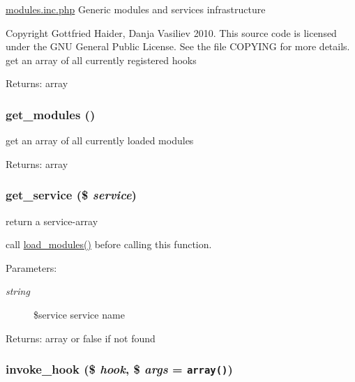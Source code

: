 \hyperlink{modules_8inc_8php}{modules.inc.php} Generic modules and services infrastructure

Copyright Gottfried Haider, Danja Vasiliev 2010. This source code is licensed under the GNU General Public License. See the file COPYING for more details. get an array of all currently registered hooks

\begin{Desc}
\item[Returns:]array \end{Desc}
\hypertarget{modules_8inc_8php_1b73e435e11b07906d0781b146b4aa21}{
\subsubsection[{get\_\-modules}]{\setlength{\rightskip}{0pt plus 5cm}get\_\-modules ()}}
\label{modules_8inc_8php_1b73e435e11b07906d0781b146b4aa21}


get an array of all currently loaded modules

\begin{Desc}
\item[Returns:]array \end{Desc}
\hypertarget{modules_8inc_8php_bf7633223c2fd4ecb199a8e0dc070802}{
\subsubsection[{get\_\-service}]{\setlength{\rightskip}{0pt plus 5cm}get\_\-service (\$ {\em service})}}
\label{modules_8inc_8php_bf7633223c2fd4ecb199a8e0dc070802}


return a service-array

call \hyperlink{modules_8inc_8php_23f8be02dc2148a3c860119a1d6ea276}{load\_\-modules()} before calling this function. \begin{Desc}
\item[Parameters:]
\begin{description}
\item[{\em string}]\$service service name \end{description}
\end{Desc}
\begin{Desc}
\item[Returns:]array or false if not found \end{Desc}
\hypertarget{modules_8inc_8php_3318fb85bac26e6fb2397c6ea9f02322}{
\subsubsection[{invoke\_\-hook}]{\setlength{\rightskip}{0pt plus 5cm}invoke\_\-hook (\$ {\em hook}, \/  \$ {\em args} = {\tt array()})}}
\label{modules_8inc_8php_3318fb85bac26e6fb2397c6ea9f02322}



